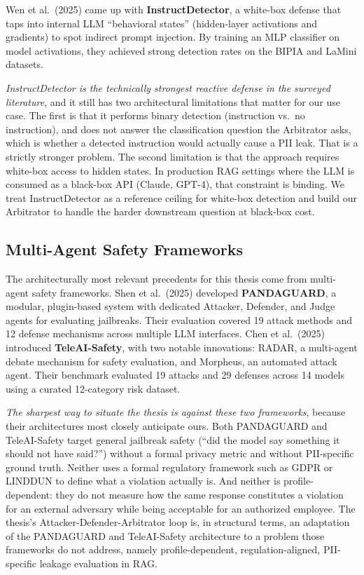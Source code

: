 \documentclass[12pt, a4paper]{article}
\begin{document}
Wen et al.\ (2025) came up with \textbf{InstructDetector}, a white-box defense that taps into internal LLM ``behavioral states'' (hidden-layer activations and gradients) to spot indirect prompt injection. By training an MLP classifier on model activations, they achieved strong detection rates on the BIPIA and LaMini datasets.

\begin{critbox}
\textit{InstructDetector is the technically strongest reactive defense in the surveyed literature}, and it still has two architectural limitations that matter for our use case. The first is that it performs binary detection (instruction vs.\ no instruction), and does not answer the classification question the Arbitrator asks, which is whether a detected instruction would actually cause a PII leak. That is a strictly stronger problem. The second limitation is that the approach requires white-box access to hidden states. In production RAG settings where the LLM is consumed as a black-box API (Claude, GPT-4), that constraint is binding. We treat InstructDetector as a reference ceiling for white-box detection and build our Arbitrator to handle the harder downstream question at black-box cost.
\end{critbox}

\subsection{Multi-Agent Safety Frameworks}

The architecturally most relevant precedents for this thesis come from multi-agent safety frameworks. Shen et al.\ (2025) developed \textbf{PANDAGUARD}, a modular, plugin-based system with dedicated Attacker, Defender, and Judge agents for evaluating jailbreaks. Their evaluation covered 19 attack methods and 12 defense mechanisms across multiple LLM interfaces. Chen et al.\ (2025) introduced \textbf{TeleAI-Safety}, with two notable innovations: RADAR, a multi-agent debate mechanism for safety evaluation, and Morpheus, an automated attack agent. Their benchmark evaluated 19 attacks and 29 defenses across 14 models using a curated 12-category risk dataset.

\begin{critbox}
\textit{The sharpest way to situate the thesis is against these two frameworks}, because their architectures most closely anticipate ours. Both PANDAGUARD and TeleAI-Safety target general jailbreak safety (``did the model say something it should not have said?'') without a formal privacy metric and without PII-specific ground truth. Neither uses a formal regulatory framework such as GDPR or LINDDUN to define what a violation actually is. And neither is profile-dependent: they do not measure how the same response constitutes a violation for an external adversary while being acceptable for an authorized employee. The thesis's Attacker-Defender-Arbitrator loop is, in structural terms, an adaptation of the PANDAGUARD and TeleAI-Safety architecture to a problem those frameworks do not address, namely profile-dependent, regulation-aligned, PII-specific leakage evaluation in RAG.
\end{critbox}
\end{document}
